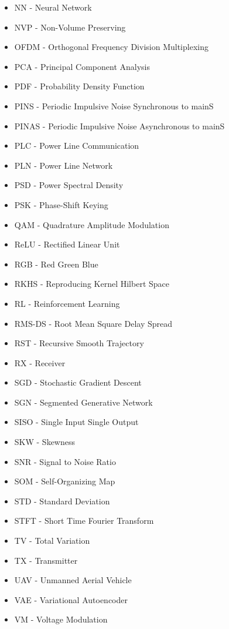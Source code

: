 \begin{multicols}{2}
\begin{itemize}
		\item NN - Neural Network
            \item NVP - Non-Volume Preserving
		\item OFDM - Orthogonal Frequency Division Multiplexing
		\item PCA - Principal Component Analysis
		\item PDF - Probability Density Function
		\item PINS - Periodic Impulsive Noise Synchronous to mainS
		\item PINAS - Periodic Impulsive Noise Asynchronous to mainS
		\item PLC - Power Line Communication
		\item PLN - Power Line Network	
		\item PSD - Power Spectral Density
            \item PSK - Phase-Shift Keying
            \item QAM - Quadrature Amplitude Modulation
            \item ReLU - Rectified Linear Unit
            \item RGB - Red Green Blue
            \item RKHS - Reproducing Kernel Hilbert Space
            \item RL - Reinforcement Learning
            \item RMS-DS - Root Mean Square Delay Spread
            \item RST - Recursive Smooth Trajectory
		\item RX - Receiver
            \item SGD - Stochastic Gradient Descent
            \item SGN - Segmented Generative Network
		\item SISO - Single Input Single Output
            \item SKW - Skewness
		\item SNR - Signal to Noise Ratio
		\item SOM - Self-Organizing Map
            \item STD - Standard Deviation
            \item STFT - Short Time Fourier Transform
            \item TV - Total Variation
		\item TX - Transmitter
            \item UAV - Unmanned Aerial Vehicle
            \item VAE - Variational Autoencoder
            \item VM - Voltage Modulation
	\end{itemize}
\end{multicols}
\normalsize